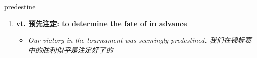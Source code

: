 
\begin{frame}
{\huge predestine}
\begin{center}
\begin{enumerate}\Large
  \item \textbf{vt. 预先注定: to determine the fate of in advance}
  \begin{itemize}
    \item \em{\Large{Our victory in the tournament was seemingly predestined. 我们在锦标赛中的胜利似乎是注定好了的}}
  \end{itemize}
\end{enumerate}
\end{center}
\end{frame}
